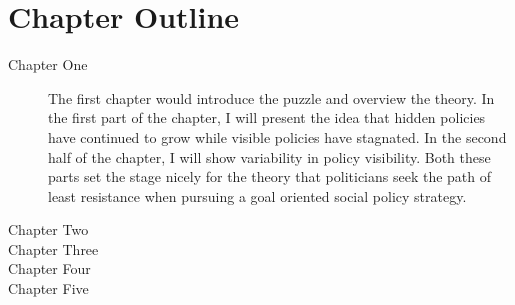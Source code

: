 \documentclass[12pt]{article}
\begin{document}
\section{Chapter Outline}
\begin{description}
\item[Chapter One] The first chapter would introduce the puzzle and overview the theory. In the first part of the chapter, I will present the idea that hidden policies have continued to grow while visible policies have stagnated. In the second half of the chapter, I will show variability in policy visibility. Both these parts set the stage nicely for the theory that politicians seek the path of least resistance when pursuing a goal oriented social policy strategy.
\item[Chapter Two]
\item[Chapter Three]
\item[Chapter Four]
\item[Chapter Five]
\end{description}

\newpage
    {}


\end{document}
